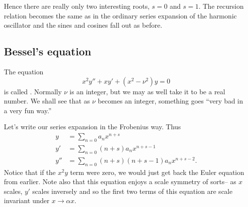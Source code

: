 Hence there are really only two interesting roots, $s=0$ and $s=1$. The recursion relation becomes the same as in the ordinary series expansion of the harmonic oscillator and the sines and cosines fall out as before.

\subsection*{Bessel's equation}
The equation
\begin{equation}
    x^2 y'' + x y' + (x^2-\nu^2) y=0
\end{equation}
is called . Normally $\nu$ is an integer, but we may as well take it to be a real number. We shall see that as $\nu$ becomes an integer, something goes ``very bad in a very fun way.''

Let's write our series expansion in the Frobenius way. Thus
\begin{align}
    y&= \sum_{n=0} a_n x^{n+s}\\
    y'&= \sum_{n=0} (n+s)a_n x^{n+s-1}\\
    y''&= \sum_{n=0} (n+s)(n+s-1)a_n x^{n+s-2}.
\end{align}
Notice that if the $x^2 y$ term were zero, we would just get back the Euler equation from earlier. Note also that this equation enjoys a scale symmetry of sorts-- as $x$ scales, $y'$ scales inversely and so the first two terms of this equation are scale invariant under $x\to \alpha x$.

